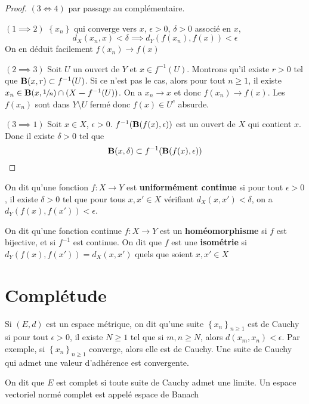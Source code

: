 \begin{proof}
    $(3 \iff  4)$ par passage au complémentaire.

    $(1 \implies 2)$  $ \left\{ x_n \right\} $ qui converge vers $x$,  $\epsilon>0$,  $\delta>0$ associé en  $x$,  \[
        d_X(x_n, x)<\delta \implies  d_Y(f(x_n), f(x))<\epsilon
    \] 
    On en déduit facilement $f(x_n)\longrightarrow f(x)$

    $(2 \implies 3)$ Soit $U$ un ouvert de  $Y$ et  $x \in  f^{-1}(U)$. Montrons qu'il existe $r>0$ tel que  $\mathbf B(x, r)\subset f^{-1}(U)$. Si ce n'est pas le cas, alors pour tout $n\geq 1$, il existe $x_n \in  \mathbf B(x, \sfrac 1n)\cap (X\bm- f^{-1} (U))$. On a $x_n \to  x$ et donc $f(x_n) \to  f(x)$. Les $f(x_n)$ sont dans  $Y\setminus U$ fermé donc $f(x) \in  U^c$ absurde.

    $(3 \implies 1)$ Soit $x \in  X$, $\epsilon>0$. $f^{-1}(\mathbf B(f(x), \epsilon))$ est un ouvert de $X$ qui contient  $x$. Donc il existe  $\delta>0$ tel que  \[
        \mathbf B(x, \delta) \subset f^{-1}(\mathbf B(f(x), \epsilon))
    \] 
\end{proof}

\begin{dfn}
    On dit qu'une fonction $f: X \rightarrow Y$ est \textbf{uniformément continue} si pour tout $\epsilon>0$, il existe $\delta>0$ tel que pour tous $x, x' \in X$ vérifiant $d_{X}\left(x, x'\right)<\delta$, on a $d_{Y}\left(f(x), f\left(x'\right)\right)<\epsilon$.

    On dit qu'une fonction continue $f: X \rightarrow Y$ est un \textbf{homéomorphisme}  si $f$ est bijective, et si $f^{-1}$ est continue. On dit que $f$ est une \textbf{isométrie}  si $d_{Y}\left(f(x), f\left(x'\right)\right)=d_{X}\left(x, x'\right)$ quels que soient $x, x' \in X$
\end{dfn}


\section{Complétude}

\begin{dfn}[Complétude]
    Si $(E, d)$ est un espace métrique, on dit qu'une suite $\left\{x_{n}\right\}_{n \geq 1}$ est de Cauchy si pour tout $\epsilon>0$, il existe $N \geq 1$ tel que si $m, n \geq N$, alors $d\left(x_{m}, x_{n}\right)<\epsilon$. Par exemple, si $\left\{x_{n}\right\}_{n \geq 1}$ converge, alors elle est de Cauchy. Une suite de Cauchy qui admet une valeur d'adhérence est convergente.

    On dit que $E$ est complet si toute suite de Cauchy admet une limite. 
    Un espace vectoriel normé complet est appelé espace de Banach
\end{dfn}

